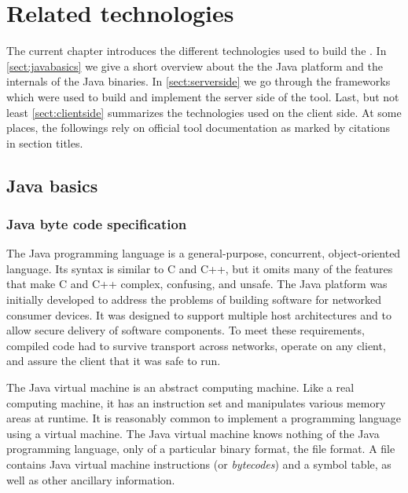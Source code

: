 \chapter{Related technologies}

The current chapter introduces the different technologies used to build the
\ptool{}. In \autoref{sect:javabasics} we give a short overview about the the
Java platform and the internals of the Java binaries. In
\autoref{sect:serverside} we go through the frameworks which were used to build
and implement the server side of the tool. Last, but not least
\autoref{sect:clientside} summarizes the technologies used on the client side.
At some places, the followings rely on official tool documentation as marked by citations in
section titles.

\section{Java basics}\label{sect:javabasics}

\subsection{Java byte code specification~\cite{JavaSpec}}
The Java programming language is a general-purpose, concurrent,
object-oriented language. Its syntax is similar to C and C++, but it omits many
of the features that make C and C++ complex, confusing, and unsafe. The Java
platform was initially developed to address the problems of building software
for networked consumer devices. It was designed to support multiple host
architectures and to allow secure delivery of software components. To meet these
requirements, compiled code had to survive transport across networks, operate on
any client, and assure the client that it was safe to run.

The Java virtual machine is an abstract computing machine. Like a real computing
machine, it has an instruction set and manipulates various memory areas at
runtime. It is reasonably common to implement a programming language using a
virtual machine. The Java virtual machine knows nothing of the Java programming
language, only of a particular binary format, the   file format. A
 file contains Java virtual machine instructions (or 
\emph{bytecodes}) and a symbol table, as well as other ancillary information.

